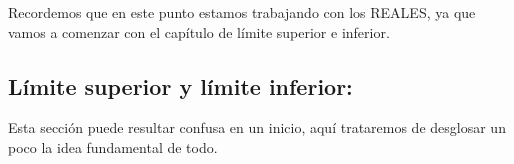 \begin{itemize}[label={✎},leftmargin=*]
Recordemos que en este punto estamos trabajando con los REALES, ya que vamos a comenzar con el capítulo de límite superior e inferior.


\subsection{Límite superior y límite inferior:}

Esta sección puede resultar confusa en un inicio, aquí trataremos de desglosar un poco la idea fundamental de todo.

\begin{basedtikz}



\begin{tikzpicture}[x=0.75pt,y=0.75pt,yscale=-1,xscale=1.5]


\end{tikzpicture}
\end{basedtikz}
\end{itemize}
